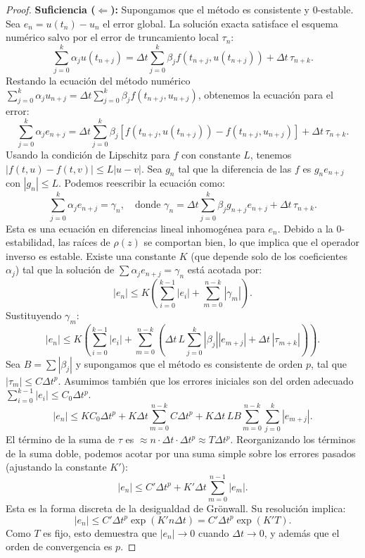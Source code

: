 \documentclass[a4paper,11pt]{report}
\begin{document}
\begin{proof}
\textbf{Suficiencia ($\Leftarrow$):}
Supongamos que el método es consistente y 0-estable. Sea $e_n = u(t_n) - u_n$ el error global.
La solución exacta satisface el esquema numérico salvo por el error de truncamiento local $\tau_n$:
\[ \sum_{j=0}^k \alpha_j u(t_{n+j}) = \Delta t\sum_{j=0}^k \beta_j f(t_{n+j}, u(t_{n+j})) + \Delta t\,\tau_{n+k}. \]
Restando la ecuación del método numérico $\sum_{j=0}^k \alpha_j u_{n+j} = \Delta t\sum_{j=0}^k \beta_j f(t_{n+j}, u_{n+j})$, obtenemos la ecuación para el error:
\[ \sum_{j=0}^k \alpha_j e_{n+j} = \Delta t\sum_{j=0}^k \beta_j [f(t_{n+j}, u(t_{n+j})) - f(t_{n+j}, u_{n+j})] + \Delta t\,\tau_{n+k}. \]
Usando la condición de Lipschitz para $f$ con constante $L$, tenemos $|f(t, u) - f(t, v)| \leq L |u - v|$. Sea $g_n$ tal que la diferencia de las $f$ es $g_n e_{n+j}$ con $|g_n| \leq L$. Podemos reescribir la ecuación como:
\[ \sum_{j=0}^k \alpha_j e_{n+j} = \gamma_n, \quad \text{donde } \gamma_n = \Delta t\sum_{j=0}^k \beta_j g_{n+j} e_{n+j} + \Delta t\,\tau_{n+k}. \]
Esta es una ecuación en diferencias lineal inhomogénea para $e_n$. Debido a la 0-estabilidad, las raíces de $\rho(z)$ se comportan bien, lo que implica que el operador inverso es estable. Existe una constante $K$ (que depende solo de los coeficientes $\alpha_j$) tal que la solución de $\sum \alpha_j e_{n+j} = \gamma_n$ está acotada por:
\[ |e_n| \leq K \left( \sum_{i=0}^{k-1} |e_i| + \sum_{m=0}^{n-k} |\gamma_m| \right). \]
Sustituyendo $\gamma_m$:
\[ |e_n| \leq K \left( \sum_{i=0}^{k-1} |e_i| + \sum_{m=0}^{n-k} \left( \Delta t\,L \sum_{j=0}^k |\beta_j| |e_{m+j}| + \Delta t\,|\tau_{m+k}| \right) \right). \]
Sea $B = \sum |\beta_j|$ y supongamos que el método es consistente de orden $p$, tal que $|\tau_m| \leq C\Delta t^p$. Asumimos también que los errores iniciales son del orden adecuado $\sum_{i=0}^{k-1} |e_i| \leq C_0\Delta t^p$.
\[ |e_n| \leq K C_0\Delta t^p + K\Delta t\sum_{m=0}^{n-k} C\Delta t^p + K\Delta t\,L B \sum_{m=0}^{n-k} \sum_{j=0}^k |e_{m+j}|. \]
El término de la suma de $\tau$ es $\approx n \cdot \Delta t \cdot \Delta t^p \approx T\Delta t^p$. Reorganizando los términos de la suma doble, podemos acotar por una suma simple sobre los errores pasados (ajustando la constante $K'$):
\[ |e_n| \leq C'\Delta t^p + K'\Delta t\sum_{m=0}^{n-1} |e_m|. \]
Esta es la forma discreta de la desigualdad de Grönwall. Su resolución implica:
\[ |e_n| \leq C'\Delta t^p \exp(K' n\Delta t) = C'\Delta t^p \exp(K' T). \]
Como $T$ es fijo, esto demuestra que $|e_n| \to 0$ cuando $\Delta t \to 0$, y además que el orden de convergencia es $p$.
\end{proof}
\end{document}
